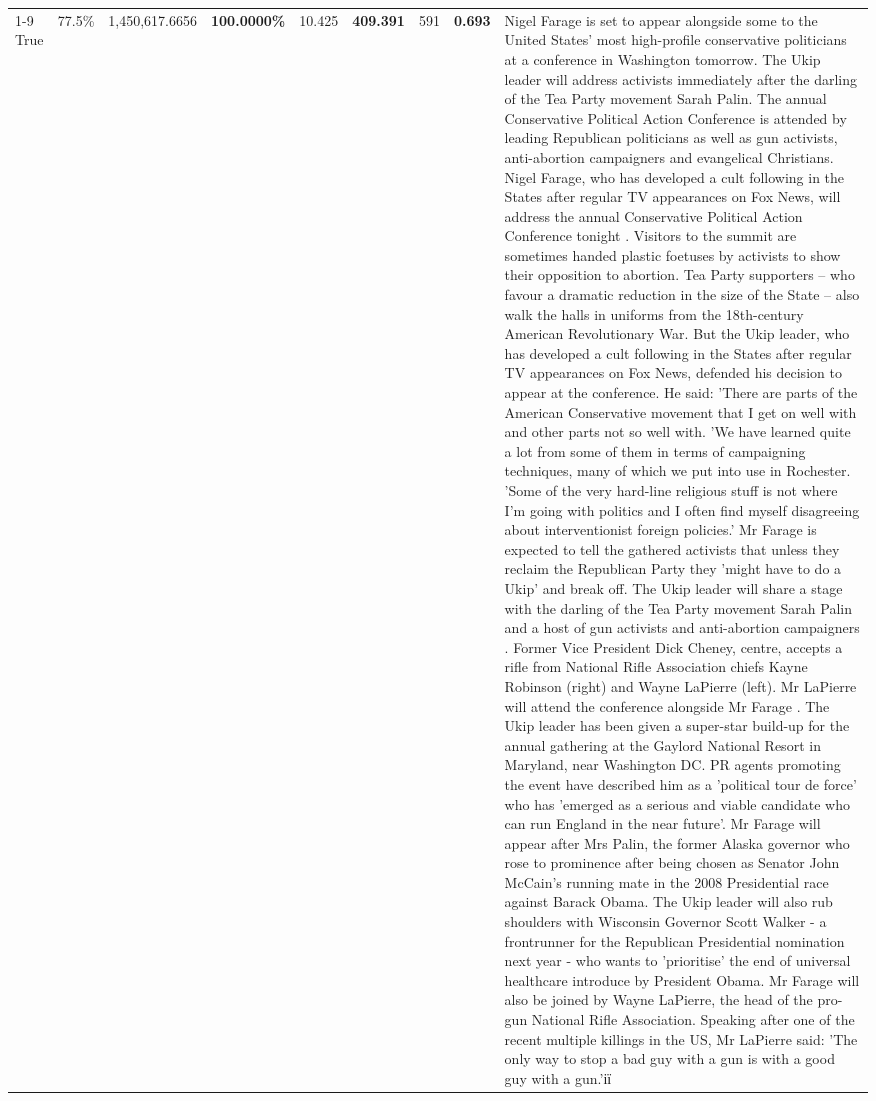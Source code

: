 \begin{table}[H]
\begin{tabular}{lllrlllll}
\cline{1-9}
True & 77.5\% & 1,450,617.6656 & \bfseries \color{red} 100.0000\% & 10.425 & \bfseries \color{red} 409.391 & 591 & \bfseries \color{red} 0.693 & Nigel Farage is set to appear alongside some to the United States' most high-profile conservative politicians at a conference in Washington tomorrow. The Ukip leader will address activists immediately after the darling of the Tea Party movement Sarah Palin. The annual Conservative Political Action Conference is attended by leading Republican politicians as well as gun activists, anti-abortion campaigners and evangelical Christians. Nigel Farage, who has developed a cult following in the States after regular TV appearances on Fox News, will address the annual Conservative Political Action Conference tonight . Visitors to the summit are sometimes handed plastic foetuses by activists to show their opposition to abortion. Tea Party supporters – who favour a dramatic reduction in the size of the State – also walk the halls in uniforms from the 18th-century American Revolutionary War. But the Ukip leader, who has developed a cult following in the States after regular TV appearances on Fox News, defended his decision to appear at the conference. He said: 'There are parts of the American Conservative movement that I get on well with and other parts not so well with. 'We have learned quite a lot from some of them in terms of campaigning techniques, many of which we put into use in Rochester. 'Some of the very hard-line religious stuff is not where I'm going with politics and I often find myself disagreeing about interventionist foreign policies.' Mr Farage is expected to tell the gathered activists that unless they reclaim the Republican Party they 'might have to do a Ukip' and break off. The Ukip leader will share a stage with the darling of the Tea Party movement Sarah Palin and a host of gun activists and anti-abortion campaigners . Former Vice President Dick Cheney, centre, accepts a rifle from National Rifle Association chiefs Kayne Robinson (right) and Wayne LaPierre (left). Mr LaPierre will attend the conference alongside Mr Farage . The Ukip leader has been given a super-star build-up for the annual gathering at the Gaylord National Resort in Maryland, near Washington DC. PR agents promoting the event have described him as a 'political tour de force' who has 'emerged as a serious and viable candidate who can run England in the near future'. Mr Farage will appear after Mrs Palin, the former Alaska governor who rose to prominence after being chosen as Senator John McCain's running mate in the 2008 Presidential race against Barack Obama. The Ukip leader will also rub shoulders with Wisconsin Governor Scott Walker - a frontrunner for the Republican Presidential nomination next year - who wants to 'prioritise' the end of universal healthcare introduce by President Obama. Mr Farage will also be joined by Wayne LaPierre, the head of the pro-gun National Rifle Association. Speaking after one of the recent multiple killings in the US, Mr LaPierre said: 'The only way to stop a bad guy with a gun is with a good guy with a gun.'ії \\

\end{tabular}
\end{table}
